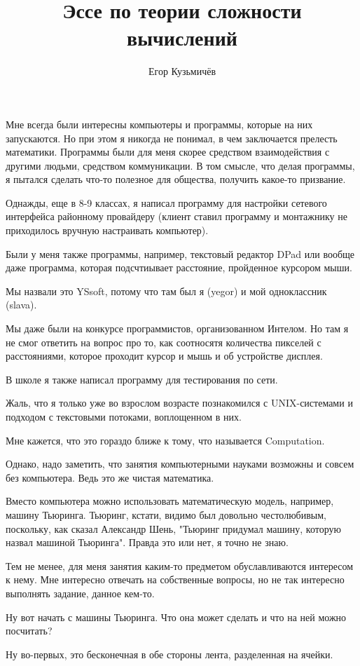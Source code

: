\documentclass{article}
\title{Эссе по теории сложности вычислений}
\author{Егор Кузьмичёв}
\begin{document}
\maketitle
Мне всегда были интересны компьютеры и программы, которые на них запускаются.
Но при этом я никогда не понимал, в чем заключается прелесть математики.
Программы были для меня скорее средством взаимодействия с другими людьми, средством коммуникации.
В том смысле, что делая программы, я пытался сделать что-то полезное для общества, получить какое-то призвание.

Однажды, еще в 8-9 классах, я написал программу для настройки сетевого интерфейса районному провайдеру (клиент ставил программу и монтажнику не приходилось вручную настраивать компьютер).

Были у меня также программы, например, текстовый редактор DPad или вообще даже программа, которая подсчтиывает расстояние, пройденное курсором мыши.

Мы назвали это YSsoft, потому что там был я (yegor) и мой одноклассник (slava).

Мы даже были на конкурсе программистов, организованном Интелом. Но там я не смог ответить на вопрос про то, как соотносятя количества пикселей с расстояниями, которое проходит курсор и мышь и об устройстве дисплея.

В школе я также написал программу для тестирования по сети. 

Жаль, что я только уже во взрослом возрасте познакомился с UNIX-системами и подходом с текстовыми потоками, воплощенном в них.

Мне кажется, что это гораздо ближе к тому, что называется Computation. 

Однако, надо заметить, что занятия компьютерными науками возможны и совсем без компьютера. Ведь это же чистая математика. 

Вместо компьютера можно использовать математическую модель, например, машину Тьюринга. 
Тьюринг, кстати, видимо был довольно честолюбивым, поскольку, как сказал Александр Шень, "Тьюринг придумал машину, которую назвал машиной Тьюринга".
Правда это или нет, я точно не знаю.

Тем не менее, для меня занятия каким-то предметом обуславливаются интересом к нему. Мне интересно отвечать на собственные вопросы, но не так интересно выполнять задание, данное кем-то. 

Ну вот начать с машины Тьюринга. Что она может сделать и что на ней можно посчитать?

Ну во-первых, это бесконечная в обе стороны лента, разделенная на ячейки.
\end{document}
